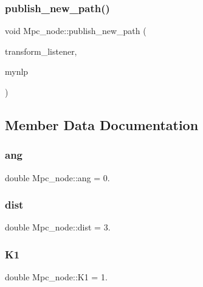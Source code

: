 \subsubsection{\texorpdfstring{publish\+\_\+new\+\_\+path()}{publish\_new\_path()}}
{\footnotesize\ttfamily void Mpc\+\_\+node\+::publish\+\_\+new\+\_\+path (\begin{DoxyParamCaption}\item[{tf\+::\+Transform\+Listener $\ast$}]{transform\+\_\+listener,  }\item[{\hyperlink{classmyNLP}{my\+N\+LP} $\ast$}]{mynlp }\end{DoxyParamCaption})}



\subsection{Member Data Documentation}
\mbox{\label{classMpc__node_a44c011b9b0c84002f5e9cb057c9a2d59}} 
\subsubsection{\texorpdfstring{ang}{ang}}
{\footnotesize\ttfamily double Mpc\+\_\+node\+::ang = 0.\hspace{0.3cm}{\ttfamily [private]}}

\mbox{\label{classMpc__node_a28803c0f092db658637ece996aad7e90}} 
\subsubsection{\texorpdfstring{dist}{dist}}
{\footnotesize\ttfamily double Mpc\+\_\+node\+::dist = 3.\hspace{0.3cm}{\ttfamily [private]}}

\mbox{\label{classMpc__node_a5c4d6221612047ebd47b0c0fe462db67}} 
\subsubsection{\texorpdfstring{K1}{K1}}
{\footnotesize\ttfamily double Mpc\+\_\+node\+::\+K1 = 1.\hspace{0.3cm}{\ttfamily [private]}}

